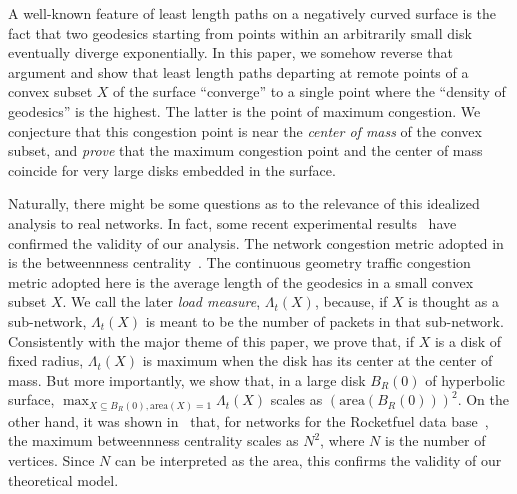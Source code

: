 \documentclass{article}
\newcommand{\area}{\mathrm{area}}
\begin{document}
A well-known feature of least length paths on a negatively curved surface is the fact that two geodesics starting from points within an arbitrarily small disk eventually diverge exponentially.  
In this paper, we somehow reverse that argument and show that least length paths departing at remote points of a convex subset $X$ of the surface ``converge'' to a single point where the ``density of geodesics'' is the highest. The latter is the point of maximum congestion. We conjecture that this congestion point is near the {\it center of mass} of the convex subset, and {\it prove} that the maximum congestion point and the center of mass coincide for very large disks embedded in the surface. 

Naturally, there might be some questions as to the relevance of this idealized analysis to real networks. In fact, some recent experimental results~\cite{arXiv_dmitri} have confirmed the validity of our analysis. The network congestion metric adopted in~\cite{arXiv_dmitri} is the betweennness centrality~\cite{congestion_tree}. The continuous geometry traffic congestion metric adopted here is the average length of the geodesics in a small convex subset $X$. We call the later {\it load measure}, $\Lambda_t (X)$, because, if $X$ is thought as a sub-network, $\Lambda_t (X)$ is meant to be the number of packets in that sub-network. Consistently with the major theme of this paper, we prove that, if $X$ is a disk of fixed radius, $\Lambda_t (X)$ is maximum when the disk has its center at the center of mass. But more importantly, we show that, in a large disk $B_R(0)$ of hyperbolic surface, $\max_{X\subseteq B_R(0),\area(X)=1} \Lambda_t (X)$ scales as $(\mbox{area}(B_R(0)))^{2}$. On the other hand, it was shown in~\cite{arXiv_dmitri} that, for networks for the Rocketfuel data base~\cite{rocketfuel}, the maximum betweennness centrality scales as $N^{2}$, where $N$ is the number of vertices. Since $N$ can be interpreted as the area, this confirms the validity of our theoretical model. 
\end{document}
